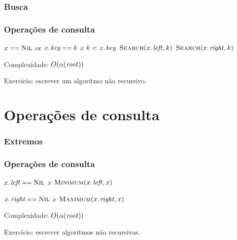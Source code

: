 \documentclass{beamer}
\begin{document}
\begin{frame}

\frametitle{Busca}
\frametitle{Operações de consulta}

\begin{codebox}
  \zi {}
  \li \If $x \isequal \const{Nil}$ or $\attrib{x}{key} \isequal k$
  \li \Then \Return $x$
  \li \Else 
  \li   \If $k < \attrib{x}{key}$
  \li   \Then \Return $\proc{Search}(\attrib{x}{left}, k)$
  \li   \Else \Return $\proc{Search}(\attrib{x}{right}, k)$
        \End
      \End
  \zi {}
  \zi {}
\end{codebox}

Complexidade: $O(\alpha(\id{root}))$
\pause

Exercício: escrever um algoritmo não recursivo.

\end{frame}

\section{Operações de consulta}

\begin{frame}

\frametitle{Extremos}
\frametitle{Operações de consulta}

\begin{codebox}
  \zi {}
  \li \If $\attrib{x}{left} \isequal \const{Nil}$
  \li \Then \Return $x$
  \li \Else \Return $\proc{Minimum}(\attrib{x}{left}, x)$
      \End
  \zi {}
\end{codebox}

\begin{codebox}
  \zi {}
  \li \If $\attrib{x}{right} \isequal \const{Nil}$
  \li \Then \Return $x$
  \li \Else \Return $\proc{Maximum}(\attrib{x}{right}, x)$
      \End
  \zi {}
\end{codebox}

Complexidade: $O(\alpha(\id{root}))$
\pause

Exercício: escrever algoritmos não recursivas.

\end{frame}
\end{document}
